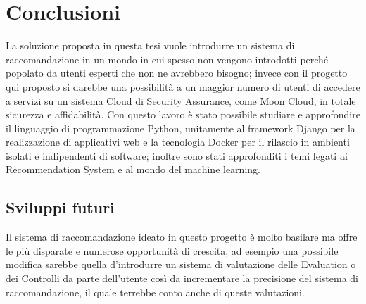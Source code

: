 \chapter{Conclusioni}\label{chp:05-conclusion}
La soluzione proposta in questa tesi vuole introdurre un sistema di raccomandazione in un mondo in cui spesso non vengono 
introdotti perché popolato da utenti esperti che non ne avrebbero bisogno; invece con il progetto qui proposto si darebbe una
possibilità a un maggior numero di utenti di accedere a servizi su un sistema Cloud di Security Assurance, come 
Moon Cloud, in totale sicurezza e affidabilità.\hfill\break
Con questo lavoro è stato possibile studiare e approfondire il linguaggio di programmazione Python, unitamente al framework 
Django per la realizzazione di applicativi web e la tecnologia Docker per il rilascio in ambienti isolati e indipendenti 
di software; inoltre sono stati approfonditi i temi legati ai Recommendation System e al mondo del machine learning.
%
\section{Sviluppi futuri}
Il sistema di raccomandazione ideato in questo progetto è molto basilare ma offre le più disparate e numerose opportunità 
di crescita, ad esempio una possibile modifica sarebbe quella d'introdurre un sistema di valutazione delle Evaluation o 
dei Controlli da parte dell'utente così da incrementare la precisione del sistema di raccomandazione, il quale terrebbe conto 
anche di queste valutazioni.
